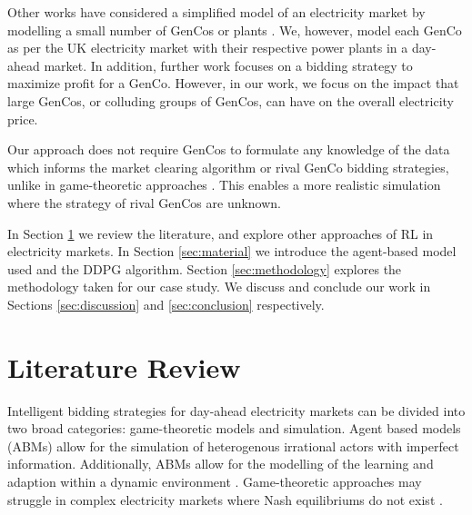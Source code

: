 \documentclass[conference]{IEEEtran}
\begin{document}
Other works have considered a simplified model of an electricity market by modelling a small number of GenCos or plants \cite{EsmaeiliAliabadi2017,Tellidou2007}. We, however, model each GenCo as per the UK electricity market with their respective power plants in a day-ahead market. In addition, further work focuses on a bidding strategy to maximize profit for a GenCo. However, in our work, we focus on the impact that large GenCos, or colluding groups of GenCos, can have on the overall electricity price.


Our approach does not require GenCos to formulate any knowledge of the data which informs the market clearing algorithm or rival GenCo bidding strategies, unlike in game-theoretic approaches \cite{Wang2011}. This enables a more realistic simulation where the strategy of rival GenCos are unknown.

In Section \ref{sec:lit-review} we review the literature, and explore other approaches of RL in electricity markets. In Section \ref{sec:material} we introduce the agent-based model used and the DDPG algorithm. Section \ref{sec:methodology} explores the methodology taken for our case study. We discuss and conclude our work in Sections \ref{sec:discussion} and \ref{sec:conclusion} respectively. 














\section{Literature Review}
\label{sec:lit-review}

Intelligent bidding strategies for day-ahead electricity markets can be divided into two broad categories: game-theoretic models and simulation. Agent based models (ABMs) allow for the simulation of heterogenous irrational actors with imperfect information. Additionally, ABMs allow for the modelling of the learning and adaption within a dynamic environment \cite{EsmaeiliAliabadi2017}. Game-theoretic approaches may struggle in complex electricity markets where Nash equilibriums do not exist \cite{Wang2011}.
\end{document}
